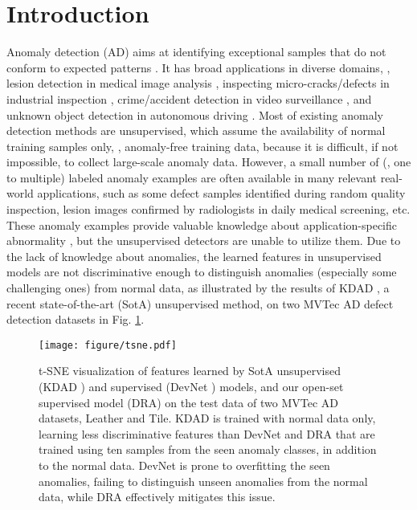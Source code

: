\documentclass[10pt,twocolumn,letterpaper]{article}
\begin{document}
\section{Introduction}
Anomaly detection (AD) 
aims at identifying exceptional samples that do not conform to expected patterns \cite{pang2021deep}. It has broad applications in diverse domains, \eg, lesion detection in medical image analysis \cite{schlegl2019f,zhang2020viral,tian2021constrained}, inspecting micro-cracks/defects in industrial inspection \cite{Bergmann_2019_CVPR,Bergmann_2020_CVPR}, crime/accident detection in video surveillance \cite{tudor2017unmasking,sultani2018real,georgescu2021anomaly,zaheer2020claws}, and unknown object detection in autonomous driving \cite{di2021pixel,tian2021pixel}. Most of existing anomaly detection methods \cite{wang2016s, salehi2021multiresolution, georgescu2021anomaly, wang2021glancing, reiss2021panda, bergman2020goad, Markovitz_2020_CVPR, Park_2020_CVPR, venkataramanan2020attention, zhou2020encoding,gong2019memorizing, Park_2020_CVPR, schlegl2019f, sabokrou2018adversarially, zaheer2020old, ruff2018deep,chen2021deep}
are unsupervised, which assume the availability of normal training samples only, \ie, anomaly-free training data, because it is difficult, if not impossible, to collect large-scale anomaly data. However, a small number of (\eg, one to multiple) labeled anomaly examples are often available in many relevant real-world applications, such as some defect samples identified during random quality inspection, lesion images confirmed by radiologists in daily medical screening, etc. These anomaly examples provide valuable knowledge about application-specific abnormality \cite{ruff2019deep,liu2019margin, pang2019deep, pang2021explainable}, but the unsupervised detectors are unable to utilize them. Due to the lack of knowledge about anomalies, the learned features in unsupervised models are not discriminative enough to distinguish anomalies (especially some challenging ones) from normal data, as illustrated by the results of KDAD \cite{salehi2021multiresolution}, a recent state-of-the-art (SotA) unsupervised method, on two MVTec AD defect detection datasets \cite{Bergmann_2019_CVPR} in Fig. \ref{fig:tsne}.

\begin{figure}[t] 
    \centering
    \texttt{[image: figure/tsne.pdf]}
    \vspace{-0.2cm}
    \caption{t-SNE visualization of features learned by SotA unsupervised (KDAD \cite{salehi2021multiresolution}) and  supervised (DevNet \cite{pang2019deep,pang2021explainable}) models, and our open-set supervised model (DRA) on the test data of two MVTec AD datasets, Leather and Tile. KDAD is trained with normal data only, learning less discriminative features than DevNet and DRA that are trained using ten samples from the seen anomaly classes, in addition to the normal data. DevNet is prone to overfitting the seen anomalies, failing to distinguish unseen anomalies from the normal data, while DRA effectively mitigates this issue.}
    \label{fig:tsne}
    \vspace{-0.5cm}
\end{figure}
\end{document}
